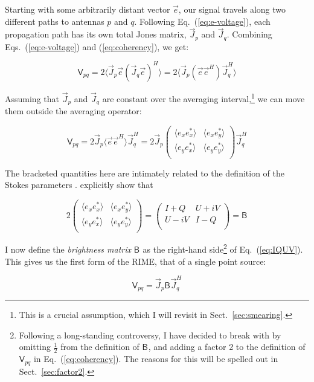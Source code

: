 \documentclass{aa}
\newcommand{\matrixtt}[4]{\left( \begin{array}{cc}#1&#2\\#3&#4\\\end{array} \right)}
\newcommand{\herm}{H}
\newcommand{\jones}[2]{\vec {#1}_{#2}}
\newcommand{\jonesT}[2]{\vec {#1}^{\herm}_{#2}}
\newcommand{\coh}[2]{\mathsf{{#1}}_{{#2}}}
\begin{document}
Starting with some arbitrarily distant vector $\vec e$, our signal travels along two different paths to antennas $p$ and $q$. Following Eq.~(\ref{eq:e-voltage}), each propagation path has its own total Jones matrix, $\jones{J}{p}$ and $\jones{J}{q}$. Combining Eqs.~(\ref{eq:e-voltage}) and (\ref{eq:coherency}), we get:

    \begin{equation}\label{eq:corr1}
    \coh{V}{pq} = 2 \langle  \jones{J}{p} \vec e ( \jones{J}{q} \vec e )^\herm \rangle  = 2 \langle  \jones{J}{p} (\vec e \vec e^\herm) \jonesT{J}{q} \rangle 
    \end{equation}

Assuming that $\jones{J}{p}$ and $\jones{J}{q}$ are constant over the averaging interval,\footnote{This is a crucial assumption, which I will revisit in Sect.~\ref{sec:smearing}.} we can move them outside the averaging operator:

    \begin{equation}\label{eq:corr2}
    \coh{V}{pq} = 2 \jones{J}{p} \langle  \vec e \vec e^\herm \rangle  \jonesT{J}{q} = 
    2 \jones{J}{p} 
    \matrixtt{\langle e_x e^*_x\rangle }{\langle e_x e^*_y\rangle }{\langle e_y e^*_x\rangle }{\langle e_y e^*_y\rangle }
    \jonesT{J}{q}
    \end{equation}

The bracketed quantities here are intimately related to the definition of the Stokes parameters \citep{born-wolf,tms}. \citet{ME3} explicitly show that

    \begin{equation}\label{eq:IQUV}
    2 
    \matrixtt{\langle e_x e^*_x\rangle }{\langle e_x e^*_y\rangle }{\langle e_y e^*_x\rangle }{\langle e_y e^*_y\rangle }
    = 
    \matrixtt{I+Q}{U+iV}{U-iV}{I-Q} = \coh{B}{}
    \end{equation}

I now define the {\em brightness matrix} $\coh{B}{}$ as the right-hand side\footnote{Following a long-standing controversy, I have decided to break with \citet{ME4} by omitting $\frac{1}{2}$ from the definition of $\coh{B}{}$, and adding a factor 2 to the definition of $\coh{V}{pq}$ in Eq.~(\ref{eq:coherency}). The reasons for this will be spelled out in Sect.~\ref{sec:factor2}.} of Eq.~(\ref{eq:IQUV}). This gives us the first form of the RIME, that of a single point source:

    \begin{equation}\label{eq:me0}
    \coh{V}{pq} = \jones{J}{p} \coh{B}{}  \jonesT{J}{q}
    \end{equation}
\end{document}
